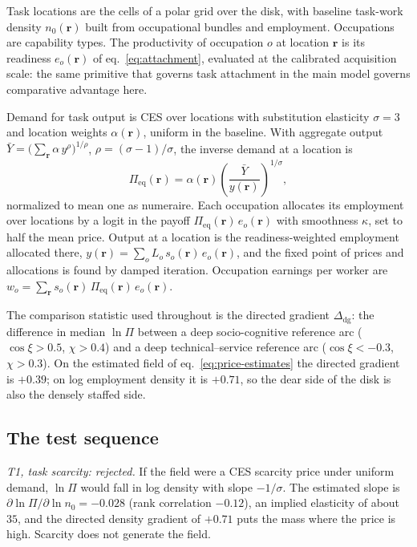 \documentclass[12pt, a4paper]{article}
\begin{document}
Task locations are the cells of a polar grid over the disk, with
baseline task-work density $n_0(\mathbf{r})$ built from occupational
bundles and employment. Occupations are capability types. The
productivity of occupation $o$ at location $\mathbf{r}$ is its
readiness $e_o(\mathbf{r})$ of eq.~\eqref{eq:attachment}, evaluated at
the calibrated acquisition scale: the same primitive that governs task
attachment in the main model governs comparative advantage here.

Demand for task output is CES over locations with substitution
elasticity $\sigma = 3$ and location weights $\alpha(\mathbf{r})$,
uniform in the baseline. With aggregate output
$\bar Y = \bigl(\sum_{\mathbf{r}} \alpha\, y^{\rho}\bigr)^{1/\rho}$,
$\rho = (\sigma-1)/\sigma$, the inverse demand at a location is
\[
  \Pi_{\mathrm{eq}}(\mathbf{r})
  =
  \alpha(\mathbf{r})
  \left(
    \frac{\bar Y}{y(\mathbf{r})}
  \right)^{1/\sigma},
\]
normalized to mean one as numeraire. Each occupation allocates its
employment over locations by a logit in the payoff
$\Pi_{\mathrm{eq}}(\mathbf{r})\,e_o(\mathbf{r})$ with smoothness
$\kappa$, set to half the mean price. Output at a location is the
readiness-weighted employment allocated there,
$y(\mathbf{r}) = \sum_o L_o\, s_o(\mathbf{r})\, e_o(\mathbf{r})$, and
the fixed point of prices and allocations is found by damped
iteration. Occupation earnings per worker are
$w_o = \sum_{\mathbf{r}} s_o(\mathbf{r})\,
\Pi_{\mathrm{eq}}(\mathbf{r})\, e_o(\mathbf{r})$.

The comparison statistic used throughout is the directed gradient
$\Delta_{\mathrm{dg}}$: the difference in median $\ln\Pi$ between a
deep socio-cognitive reference arc ($\cos\xi > 0.5$, $\chi > 0.4$) and
a deep technical--service reference arc ($\cos\xi < -0.3$,
$\chi > 0.3$). On the estimated field of
eq.~\eqref{eq:price-estimates} the directed gradient is $+0.39$; on
log employment density it is $+0.71$, so the dear side of the disk is
also the densely staffed side.

\subsection*{The test sequence}

\emph{T1, task scarcity: rejected.} If the field were a CES scarcity
price under uniform demand, $\ln\Pi$ would fall in log density with
slope $-1/\sigma$. The estimated slope is
$\partial\ln\Pi/\partial\ln n_0 = -0.028$ (rank correlation $-0.12$),
an implied elasticity of about $35$, and the directed density gradient
of $+0.71$ puts the mass where the price is high. Scarcity does not
generate the field.
\end{document}
